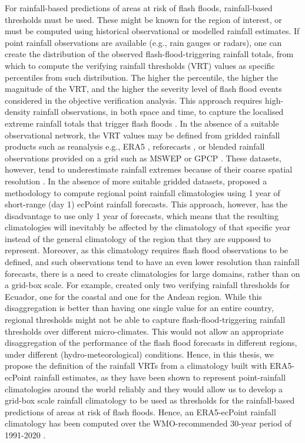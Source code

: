 For rainfall-based predictions of areas at risk of flash floods, rainfall-based thresholds must be used. These might be known for the region of interest, or must be computed using historical observational or modelled rainfall estimates. If point rainfall observations are available (e.g., rain gauges or radars), one can create the distribution of the observed flash-flood-triggering rainfall totals, from which to compute the verifying rainfall thresholds (VRT) values as specific percentiles from such distribution. The higher the percentile, the higher the magnitude of the VRT, and the higher the severity level of flash flood events considered in the objective verification analysis. This approach requires high-density rainfall observations, in both space and time, to capture the localised extreme rainfall totals that trigger flash floods \citep{Haiden_2016, RamosFilho_2021}. In the absence of a suitable observational network, the VRT values may be defined from gridded rainfall products such as reanalysis e.g., ERA5 \citep{Hersbach_2020}, reforecasts \citep{Hamill_2006b}, or blended rainfall observations provided on a grid such as MSWEP \citep{Beck_2019} or GPCP \citep{Adler_2018}. These datasets, however, tend to underestimate rainfall extremes because of their coarse spatial resolution \citep{Tapiador_2019}. In the absence of more suitable gridded datasets, \citet{Pillosu_2024} proposed a methodology to compute regional point rainfall climatologies using 1 year of short-range (day 1) ecPoint rainfall forecasts. This approach, however, has the disadvantage to use only 1 year of forecasts, which means that the resulting climatologies will inevitably be affected by the climatology of that specific year instead of the general climatology of the region that they are supposed to represent. Moreover, as this climatology requires flash flood observations to be defined, and such observations tend to have an even lower resolution than rainfall forecasts, there is a need to create climatologies for large domains, rather than on a grid-box scale. For example, \citet{Pillosu_2024} created only two verifying rainfall thresholds for Ecuador, one for the coastal and one for the Andean region. While this disaggregation is better than having one single value for an entire country, regional thresholds might not be able to capture flash-flood-triggering rainfall thresholds over different micro-climates. This would not allow an appropriate disaggregation of the performance of the flash flood forecasts in different regions, under different (hydro-meteorological) conditions. Hence, in this thesis, we propose the definition of the rainfall VRTs from a climatology built with ERA5-ecPoint rainfall estimates, as they have been shown to represent point-rainfall climatologies around the world reliably \citep{Pillosu_2025a} and they would allow us to develop a grid-box scale rainfall climatology to be used as thresholds for the rainfall-based predictions of areas at risk of flash floods. Hence, an ERA5-ecPoint rainfall climatology has been computed over the WMO-recommended 30-year period of 1991-2020 \citep{WMO_2017}.

